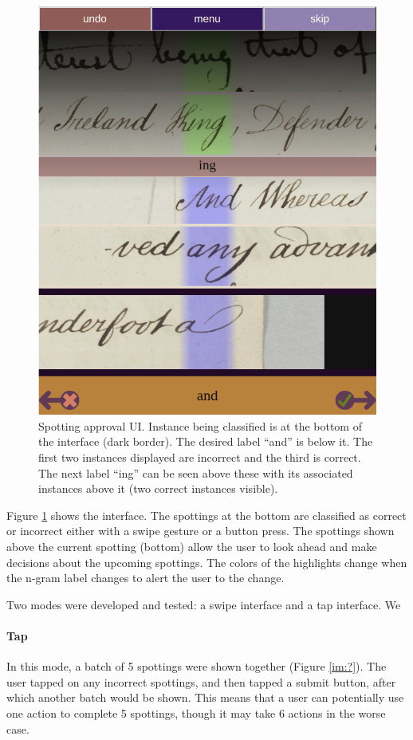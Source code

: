 \documentclass[ms,electronic,twosidetoc,letterpaper,chaptercenter,parttop,lof,lot]{byumsphd}
\begin{document}
\begin{figure}
    \centering
    \includegraphics[width=.75\textwidth]{spottingapproval}
    \caption{Spotting approval UI. Instance being classified is at the bottom of the interface (dark border). The desired label ``and'' is below it. The first two instances displayed are incorrect and the third is correct. The next label ``ing'' can be seen above these with its associated instances above it (two correct instances visible).
    }
    \label{fig:spottingapproval}
\end{figure}

Figure \ref{fig:spottingapproval} shows the interface. The spottings at the bottom are classified as correct or incorrect either with a swipe gesture or a button press. The spottings shown above the current spotting (bottom) allow the user to look ahead and make decisions about the upcoming spottings. The colors of the highlights change when the n-gram label changes to alert the user to the change.



\iffalse
Two modes were developed and tested: a swipe interface and a tap interface. We

\paragraph{Tap}
In this mode, a batch of 5 spottings were shown together (Figure \ref{im:?}). The user tapped on any incorrect spottings, and then tapped a submit button, after which another batch would be shown. This means that a user can potentially use one action to complete 5 spottings, though it may take 6 actions in the worse case.
\end{document}
